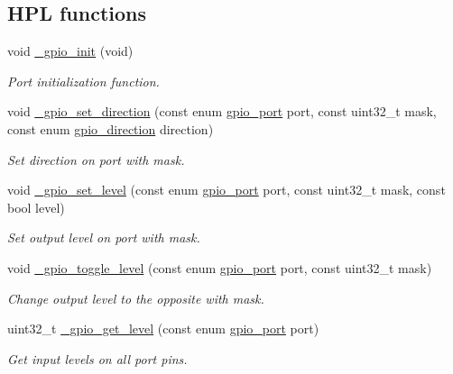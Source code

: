 \subsection*{H\+PL functions}
\begin{DoxyCompactItemize}
\item 
void \hyperlink{group___h_p_l_ga6e226919d4a3ee84599b55a32597e284}{\+\_\+gpio\+\_\+init} (void)
\begin{DoxyCompactList}\small\item\em Port initialization function. \end{DoxyCompactList}\item 
void \hyperlink{group___h_p_l_gad0c9a05c8d3510204e45f6c292e39996}{\+\_\+gpio\+\_\+set\+\_\+direction} (const enum \hyperlink{group___h_p_l_ga6d50d8c4b17ff573c07340d4d7965bc1}{gpio\+\_\+port} port, const uint32\+\_\+t mask, const enum \hyperlink{group___h_p_l_gaccc7d029df9e5a96151a68e64f4be7e2}{gpio\+\_\+direction} direction)
\begin{DoxyCompactList}\small\item\em Set direction on port with mask. \end{DoxyCompactList}\item 
void \hyperlink{group___h_p_l_ga6dfca37dc99595ea4b013a931a35ba7f}{\+\_\+gpio\+\_\+set\+\_\+level} (const enum \hyperlink{group___h_p_l_ga6d50d8c4b17ff573c07340d4d7965bc1}{gpio\+\_\+port} port, const uint32\+\_\+t mask, const bool level)
\begin{DoxyCompactList}\small\item\em Set output level on port with mask. \end{DoxyCompactList}\item 
void \hyperlink{group___h_p_l_ga00df21e108dc46a00f686923d5cd731e}{\+\_\+gpio\+\_\+toggle\+\_\+level} (const enum \hyperlink{group___h_p_l_ga6d50d8c4b17ff573c07340d4d7965bc1}{gpio\+\_\+port} port, const uint32\+\_\+t mask)
\begin{DoxyCompactList}\small\item\em Change output level to the opposite with mask. \end{DoxyCompactList}\item 
uint32\+\_\+t \hyperlink{group___h_p_l_gaaa9499706a1ad34050473faacabc89af}{\+\_\+gpio\+\_\+get\+\_\+level} (const enum \hyperlink{group___h_p_l_ga6d50d8c4b17ff573c07340d4d7965bc1}{gpio\+\_\+port} port)
\begin{DoxyCompactList}\small\item\em Get input levels on all port pins. \end{DoxyCompactList}\item 

\end{DoxyCompactItemize}
